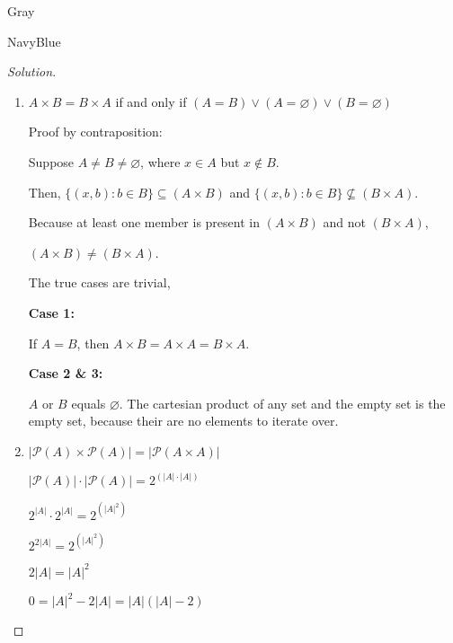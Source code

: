 \documentclass[12pt]{amsart}
\theoremstyle{named}
\newenvironment{soln}
{\begin{color}{Gray}\begin{framed}\begin{color}{NavyBlue}\begin{proof}[Solution]
\doublespacing}
{\end{proof}\end{color}\end{framed}\end{color}}
\theoremstyle{definition}
\begin{document}
\begin{soln} 
    \phantom{ }
    \begin{enumerate}
        \item $A\times B = B\times A$ if and only if $(A = B) \lor (A =
        \varnothing) \lor (B = \varnothing)$ 
        
        \noindent Proof by contraposition: 
        
        \begin{adjustwidth}{2em}{0em} 
            Suppose $A \neq B \neq \varnothing$, where $ x \in A $ but $x \notin
            B$. 
            
            \noindent Then, $\{(x,b) : b \in B \} \subseteq (A \times B)$ and
            $\{(x,b) : b \in B \} \nsubseteq (B \times A)$. 
            
            \noindent Because at least one member is present in $(A \times B)$
            and not $(B \times A)$,
            
            \noindent $(A \times B) \neq (B \times A)$. 
        \end{adjustwidth}

        \noindent The true cases are trivial,

        \noindent \textbf{Case 1:}
        \begin{adjustwidth}{2em}{0em}
            If $A = B$, then $A \times B = A \times A = B \times A$.
        \end{adjustwidth}
        
        \noindent \textbf{Case 2 \& 3:}
        \begin{adjustwidth}{2em}{0em}
            $A$ or $B$ equals $\varnothing$. The cartesian product of any set
        and the empty set is the empty set, because their are no elements to
        iterate over. 
        
        \end{adjustwidth}


        \item $|\mathscr P(A)\times\mathscr P(A)| = |\mathscr P(A\times A)|$ 
        
        \noindent$|\mathscr P(A)| \cdot |\mathscr P(A)| = 2^{(|A| \cdot |A|)}$

        \noindent$2^{|A|} \cdot 2^{|A|} = 2^{(|A|^{2})}$

        \noindent$2^{2|A|} = 2^{(|A|^{2})}$

        \noindent$2|A| = |A|^2$

        \noindent$0 = |A|^2 - 2|A| = |A|(|A| - 2)$


\end{enumerate}
\end{soln}
\end{document}

